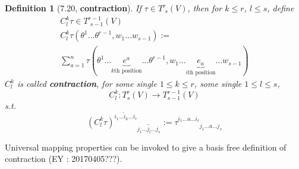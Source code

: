 \documentclass[10pt]{amsart}
\newtheorem{definition}{Definition}
\begin{document}
\begin{multicols*}{2}
\begin{definition}[7.20\cite{JLee2009}, \textbf{contraction}]
If $\tau \in T^r_{ \,\, s}(V)$, then for $k\leq r$, $l\leq s$, define 
\begin{equation}
\begin{gathered}
	C^k_l \tau \in T^{r-1}_{ \, \, s-1}(V) \\ 
 C^k_l\tau(\theta^1 \dots \theta^{r-1}, w_1\dots w_{s-1}) := \\
	\sum_{a=1}^n \tau(\theta^1 \dots \underbrace{e^a}_{\text{$k$th position} } \dots \theta^{r-1}, w_1 \dots \underbrace{e_a}_{\text{$i$th position}} \dots w_{s-1}  )
\end{gathered}
\end{equation}
$C^k_l$ is called \textbf{contraction}, for some single $1\leq k \leq r$, some single $1\leq l \leq s$, 
\[
C^k_l: T^r_s(V) \to T^{r-1}_{s-1}(V)
\]
s.t.
\[
(C^k_l\tau)^{i_1\dots \widehat{i}_k\dots i_r }_{ \phantom{i_1\dots \widehat{i}_k\dots i_r} j_1\dots \widehat{j}_l \dots j_s} := \tau^{i_1\dots a \dots i_r}_{ \phantom{i_1\dots a \dots i_r} j_1 \dots a \dots j_s }
\]
\end{definition}

Universal mapping properties can be invoked to give a basis free definition of contraction (EY : 20170405???).  


\end{multicols*}
\end{document}

